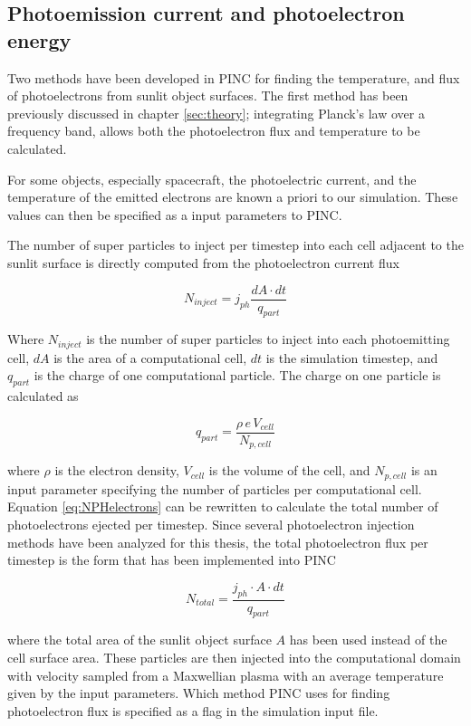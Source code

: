 \subsection{Photoemission current and photoelectron energy}\label{subsection:CurrentDensity}
Two methods have been developed in PINC for finding the temperature, and flux of photoelectrons from sunlit object surfaces. The first method has been previously discussed in chapter \cref{sec:theory}; integrating Planck's law over a frequency band, allows both the photoelectron flux and temperature to be calculated. 

For some objects, especially spacecraft, the photoelectric current, and the temperature of the emitted electrons are known a priori to our simulation. These values can then be specified as a input parameters to PINC.

The number of super particles to inject per timestep into each cell adjacent to the sunlit surface is directly computed from the photoelectron current flux \parencite{Deca2013}

\begin{equation}\label{eq:NPHelectrons}
    N_{inject} = j_{ph} \frac{dA \cdot dt}{q_{part}}
\end{equation}

Where $N_{inject}$ is the number of super particles to inject into each photoemitting cell, $dA$ is the area of a computational cell, $dt$ is the simulation timestep, and $q_{part}$ is the charge of one computational particle. The charge on one particle is calculated as

\begin{equation}
    q_{part} = \frac{\rho \, e \, V_{cell}}{N_{p,cell}}
\end{equation}

where $\rho$ is the electron density, $V_{cell}$ is the volume of the cell, and $N_{p,cell}$ is an input parameter specifying the number of particles per computational cell. Equation \eqref{eq:NPHelectrons} can be rewritten to calculate the total number of photoelectrons ejected per timestep. Since several photoelectron injection methods have been analyzed for this thesis, the total photoelectron flux per timestep is the form that has been implemented into PINC

\begin{equation}
    N_{total} =  \frac{j_{ph} \cdot A \cdot dt}{q_{part}}
\end{equation}

where the total area of the sunlit object surface $A$ has been used instead of the cell surface area. These particles are then injected into the computational domain with velocity sampled from a Maxwellian plasma with an average temperature given by the input parameters. Which method PINC uses for finding photoelectron flux is specified as a flag in the simulation input file.  

